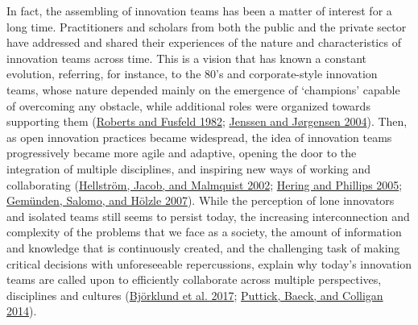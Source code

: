 \documentclass[AMA,STIX1COL,APA,STIX2COL]{WileyNJD-v2}
\begin{document}
In fact, the assembling of innovation teams has been a matter of
interest for a long time. Practitioners and scholars from both the
public and the private sector have addressed and shared their
experiences of the nature and characteristics of innovation teams across
time. This is a vision that has known a constant evolution, referring,
for instance, to the 80's and corporate-style innovation teams, whose
nature depended mainly on the emergence of `champions' capable of
overcoming any obstacle, while additional roles were organized towards
supporting them (\protect\hyperlink{ref-Roberts1982}{Roberts and Fusfeld
1982}; \protect\hyperlink{ref-Jenssen2004}{Jenssen and Jørgensen 2004}).
Then, as open innovation practices became widespread, the idea of
innovation teams progressively became more agile and adaptive, opening
the door to the integration of multiple disciplines, and inspiring new
ways of working and collaborating
(\protect\hyperlink{ref-Hellstrom2002}{Hellström, Jacob, and Malmquist
2002}; \protect\hyperlink{ref-Hering2005}{Hering and Phillips 2005};
\protect\hyperlink{ref-Gemunden2007}{Gemünden, Salomo, and Hölzle
2007}). While the perception of lone innovators and isolated teams still
seems to persist today, the increasing interconnection and complexity of
the problems that we face as a society, the amount of information and
knowledge that is continuously created, and the challenging task of
making critical decisions with unforeseeable repercussions, explain why
today's innovation teams are called upon to efficiently collaborate
across multiple perspectives, disciplines and cultures
(\protect\hyperlink{ref-Bjorklund2017}{Björklund et al. 2017};
\protect\hyperlink{ref-Puttick2014-Teams}{Puttick, Baeck, and Colligan
2014}).
\end{document}
